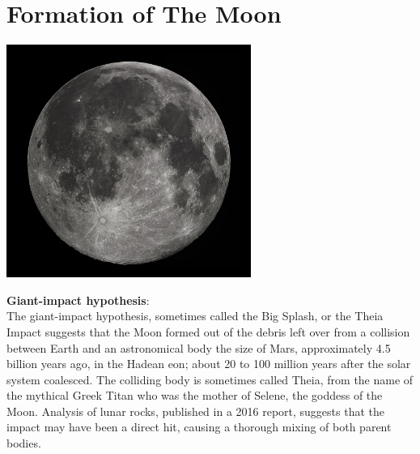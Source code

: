 \documentclass[11pt]{report}
\begin{document}
\section{Formation of The Moon}
\vspace{2mm}\begin{center}\includegraphics[width=8cm]{./img/moon.jpg}\end{center}
\textbf{Giant-impact hypothesis}:\\
The giant-impact hypothesis, sometimes called the Big Splash, or the Theia Impact suggests that the Moon formed out of the debris left over from a collision between Earth and an astronomical body the size of Mars, approximately 4.5 billion years ago, in the Hadean eon; about 20 to 100 million years after the solar system coalesced. The colliding body is sometimes called Theia, from the name of the mythical Greek Titan who was the mother of Selene, the goddess of the Moon. Analysis of lunar rocks, published in a 2016 report, suggests that the impact may have been a direct hit, causing a thorough mixing of both parent bodies.

\end{document}
